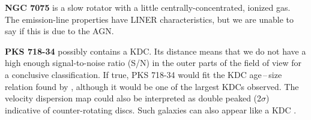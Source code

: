 \textbf{NGC 7075} is a slow rotator with a little centrally-concentrated, ionized gas. The emission-line properties have LINER characteristics, but we are unable to say if this is due to the AGN.

\textbf{PKS 718-34} possibly contains a KDC. Its distance means that we do not have a high enough signal-to-noise ratio (S/N) in the outer parts of the field of view for a conclusive classification. If true, PKS 718-34 would fit the KDC age\,--\,size relation found by \citet{Kuntschner2010}, although it would be one of the largest KDCs observed. The velocity dispersion map could also be interpreted as double peaked (2$\sigma$) indicative of counter-rotating discs. Such galaxies can also appear like a KDC \citep[e.g.][]{Bois2011}.
